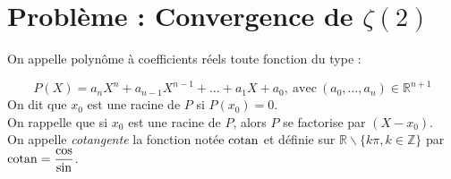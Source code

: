 \documentclass[a4paper,french,bookmarks]{article}
\def\cotan{\qopname\relax o{cotan}}
\begin{document}
\newpage
\section*{Problème : Convergence de $\zeta(2)$}




On appelle polynôme à coefficients réels toute fonction du type :

\[ P(X) = a_nX^n + a_{n-1}X^{n-1} + \dots + a_1X + a_0, \ \text{avec} \ (a_0,\dots,a_n) \in \mathbb{R}^{n+1}\]
On dit que $x_0$ est une racine de $P$ si $P(x_0) = 0$.\\
On rappelle que si $x_0$ est une racine de $P$, alors $P$ se factorise par $(X-x_0)$.\\
On appelle \textit{cotangente} la fonction notée $\cotan$ et définie sur $\mathbb{R} \backslash \{k\pi, k \in \mathbb{Z}\}$ par $\cotan = \dfrac{\cos}{\sin}$.\\
\end{document}
